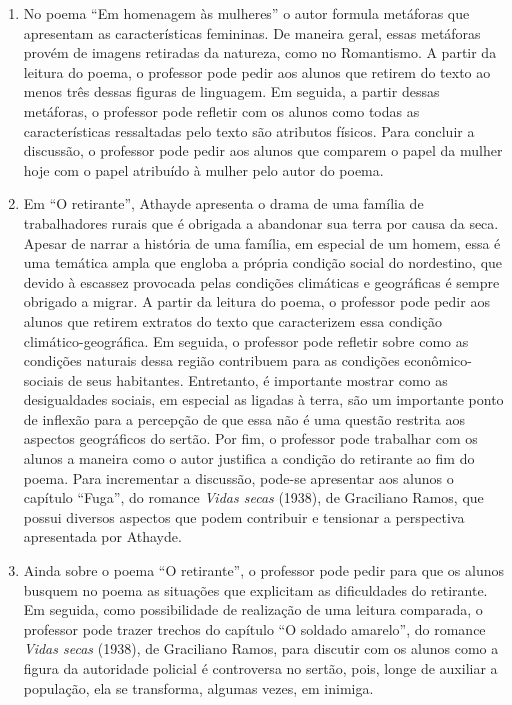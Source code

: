 \begin{enumerate}
\begin{verse}
\end{verse}

\item No poema ``Em homenagem às
mulheres'' o autor formula metáforas que
apresentam as características femininas. De maneira geral, essas
metáforas provém de imagens retiradas da natureza, como no Romantismo.
A partir da leitura do poema, o professor pode pedir aos alunos que
retirem do texto ao menos três dessas figuras de linguagem. Em seguida,
a partir dessas metáforas, o professor pode refletir com os alunos como
todas as características ressaltadas pelo texto são atributos físicos.
Para concluir a discussão, o professor pode pedir aos
alunos que comparem o papel da mulher hoje com o papel atribuído à
mulher pelo autor do poema. 

\item Em ``O retirante'', Athayde
apresenta o drama de uma família de trabalhadores rurais que é obrigada
a abandonar sua terra por causa da seca. Apesar de narrar a história de
uma família, em especial de um homem, essa é uma temática ampla que
engloba a própria condição social do nordestino, que devido à escassez
provocada pelas condições climáticas e geográficas é sempre
obrigado a migrar. A partir da leitura do poema, o professor pode pedir
aos alunos que retirem extratos do texto que caracterizem essa condição
climático-geográfica. Em seguida, o professor pode refletir sobre como
as condições naturais dessa região contribuem para as condições
econômico-sociais de seus habitantes. Entretanto, é importante
mostrar como as desigualdades sociais, em especial as ligadas à
terra, são um importante ponto de inflexão para a percepção de que essa
não é uma questão restrita aos aspectos geográficos do sertão. Por fim,
o professor pode trabalhar com os alunos a maneira como o autor
justifica a condição do retirante ao fim do poema. Para incrementar a
discussão, pode-se apresentar aos alunos o capítulo ``Fuga'', do romance \textit{Vidas secas} (1938),
de Graciliano Ramos, que possui diversos aspectos que podem contribuir e
tensionar a perspectiva apresentada por Athayde.

\item Ainda sobre o poema ``O
retirante'', o professor pode pedir para que os
alunos busquem no poema as situações que explicitam as dificuldades do
retirante. Em seguida, como possibilidade de realização de uma leitura
comparada, o professor pode trazer trechos do capítulo ``O soldado
amarelo'', do romance \textit{Vidas secas} (1938), de Graciliano Ramos, para discutir com
os alunos como a figura da autoridade policial é controversa no sertão, pois,
longe de auxiliar a população, ela se transforma, algumas vezes, em inimiga. 

\end{enumerate}
\pagebreak
